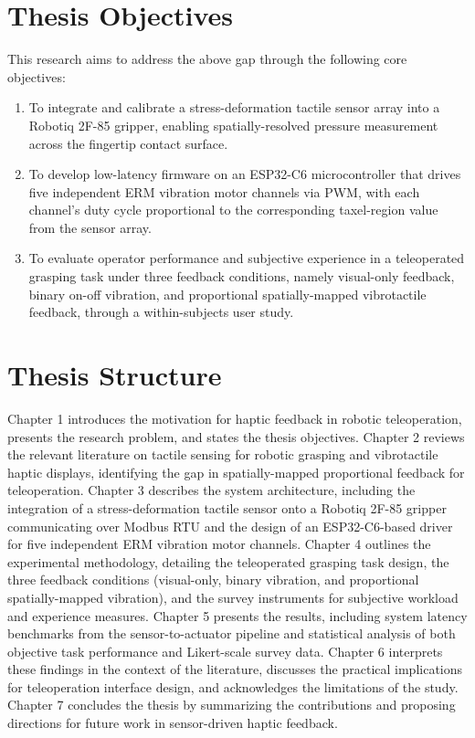 \documentclass[12pt, a4paper]{report}
\begin{document}
\section{Thesis Objectives}
This research aims to address the above gap through the following core objectives:
\begin{enumerate}
    \item To integrate and calibrate a stress-deformation tactile sensor array into a Robotiq 2F-85 gripper, enabling spatially-resolved pressure measurement across the fingertip contact surface. %
    \item To develop low-latency firmware on an ESP32-C6 microcontroller that drives five independent ERM vibration motor channels via PWM, with each channel's duty cycle proportional to the corresponding taxel-region value from the sensor array.
    \item To evaluate operator performance and subjective experience in a teleoperated grasping task under three feedback conditions, namely visual-only feedback, binary on-off vibration, and proportional spatially-mapped vibrotactile feedback, through a within-subjects user study.
\end{enumerate}

\section{Thesis Structure}
Chapter 1 introduces the motivation for haptic feedback in robotic teleoperation, presents the research problem, and states the thesis objectives. Chapter 2 reviews the relevant literature on tactile sensing for robotic grasping and vibrotactile haptic displays, identifying the gap in spatially-mapped proportional feedback for teleoperation. Chapter 3 describes the system architecture, including the integration of a stress-deformation tactile sensor onto a Robotiq 2F-85 gripper communicating over Modbus RTU and the design of an ESP32-C6-based driver for five independent ERM vibration motor channels. Chapter 4 outlines the experimental methodology, detailing the teleoperated grasping task design, the three feedback conditions (visual-only, binary vibration, and proportional spatially-mapped vibration), and the survey instruments for subjective workload and experience measures. Chapter 5 presents the results, including system latency benchmarks from the sensor-to-actuator pipeline and statistical analysis of both objective task performance and Likert-scale survey data. Chapter 6 interprets these findings in the context of the literature, discusses the practical implications for teleoperation interface design, and acknowledges the limitations of the study. Chapter 7 concludes the thesis by summarizing the contributions and proposing directions for future work in sensor-driven haptic feedback.
\end{document}
